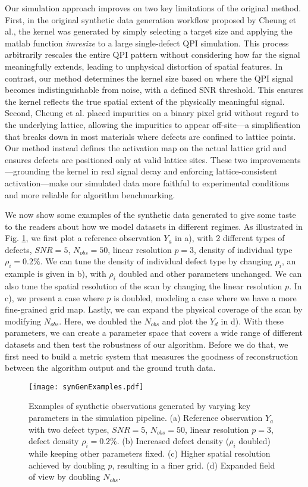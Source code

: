 Our simulation approach improves on two key limitations of the original method. First, in the original synthetic data generation workflow proposed by Cheung et al., the kernel was generated by simply selecting a target size and applying the matlab function \textit{imresize} to a large single-defect QPI simulation. This process arbitrarily rescales the entire QPI pattern without considering how far the signal meaningfully extends, leading to unphysical distortion of spatial features. In contrast, our method determines the kernel size based on where the QPI signal becomes indistinguishable from noise, with a defined SNR threshold. This ensures the kernel reflects the true spatial extent of the physically meaningful signal. Second, Cheung et al. placed impurities on a binary pixel grid without regard to the underlying lattice, allowing the impurities to appear off-site—a simplification that breaks down in most materials where defects are confined to lattice points. Our method instead defines the activation map on the actual lattice grid and ensures defects are positioned only at valid lattice sites. These two improvements—grounding the kernel in real signal decay and enforcing lattice-consistent activation—make our simulated data more faithful to experimental conditions and more reliable for algorithm benchmarking.

We now show some examples of the synthetic data generated to give some taste to the readers about how we model datasets in different regimes. As illustrated in Fig. \ref{fig:synexample}, we first plot a reference observation $Y_a$ in a), with 2 different types of defects, $SNR = 5$, $N_{obs}=50$, linear resolution $p = 3$, density of individual type $\rho_i = 0.2 \%$. We can tune the density of individual defect type by changing $\rho_i$, an example is given in b), with $\rho_i$ doubled and other parameters unchanged. We can also tune the spatial resolution of the scan by changing the linear resolution $p$. In c), we present a case where $p$ is doubled, modeling a case where we have a more fine-grained grid map. Lastly, we can expand the physical coverage of the scan by modifying $N_{obs}$. Here, we doubled the $N_{obs}$ and plot the $Y_d$ in d). With these parameters, we can create a parameter space that covers a wide range of different datasets and then test the robustness of our algorithm. Before we do that, we first need to build a metric system that measures the goodness of reconstruction between the algorithm output and the ground truth data. 

\begin{figure}
	\texttt{[image: synGenExamples.pdf]} 
	\centering
	\caption{Examples of synthetic observations generated by varying key parameters in the simulation pipeline. (a) Reference observation $Y_a$ with two defect types, $SNR = 5$, $N_{obs}=50$, linear resolution $p=3$, defect density $\rho_i=0.2\%$. (b) Increased defect density ($\rho_i$ doubled) while keeping other parameters fixed. (c) Higher spatial resolution achieved by doubling $p$, resulting in a finer grid. (d) Expanded field of view by doubling $N_{obs}$.}
	\label{fig:synexample}
\end{figure}

